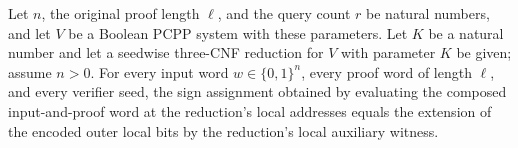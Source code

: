 \begin{theorem}
\label{FABL.compositionLocalAssignment_composeThreeQueryProof}
\leanok
{}
Let $n$, the original proof length $\ell$, and the query count $r$ be natural numbers,
and let $V$ be a Boolean PCPP system with these parameters. Let $K$ be a natural number
and let a seedwise three-CNF reduction for $V$ with parameter $K$ be given; assume
$n>0$. For every input word $w\in\{0,1\}^n$, every proof word of length $\ell$, and
every verifier seed, the sign assignment obtained by evaluating the composed
input-and-proof word at the reduction's local addresses equals the extension of the
encoded outer local bits by the reduction's local auxiliary witness.
\end{theorem}

